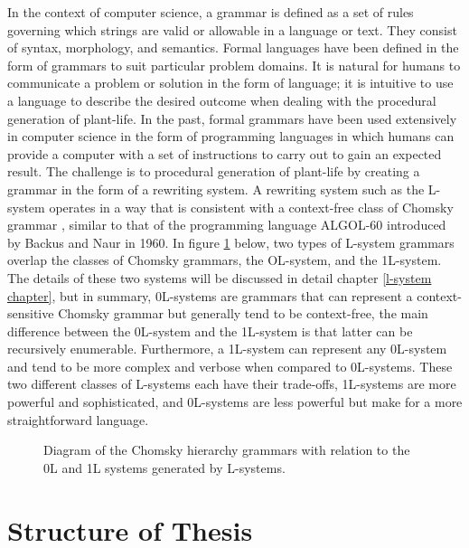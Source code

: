 In the context of computer science, a grammar is defined as a set of rules governing which strings are valid or allowable in a language or text. They consist of syntax, morphology, and semantics. Formal languages have been defined in the form of grammars to suit particular problem domains. It is natural for humans to communicate a problem or solution in the form of language; it is intuitive to use a language to describe the desired outcome when dealing with the procedural generation of plant-life. In the past, formal grammars have been used extensively in computer science in the form of programming languages in which humans can provide a computer with a set of instructions to carry out to gain an expected result. The challenge is to procedural generation of plant-life by creating a  grammar in the form of a rewriting system. A rewriting system such as the L-system operates in a way that is consistent with a context-free class of Chomsky grammar \cite{chomsky1956three}, similar to that of the programming language ALGOL-60 introduced by Backus and Naur in  1960\cite{backus1960report}. In figure \ref{chomsky grammars} below, two types of L-system grammars overlap the classes of Chomsky grammars, the OL-system, and the 1L-system. The details of these two systems will be discussed in detail chapter \ref{l-system chapter}, but in summary, 0L-systems are grammars that can represent a context-sensitive Chomsky grammar but generally tend to be context-free, the main difference between the 0L-system and the 1L-system is that latter can be recursively enumerable. Furthermore, a 1L-system can represent any 0L-system and tend to be more complex and verbose when compared to 0L-systems. These two different classes of L-systems each have their trade-offs, 1L-systems are more powerful and sophisticated, and 0L-systems are less powerful but make for a more straightforward language. 

\begin{figure}[htbp]
	{\centering
		\setlength{\fboxrule}{1pt}
		\vspace{7px}
		\caption{Diagram of the Chomsky hierarchy grammars with relation to the 0L and 1L systems generated by L-systems.} \label{chomsky grammars}
	}
\end{figure}
\FloatBarrier

\newpage

\section{Structure of Thesis}

